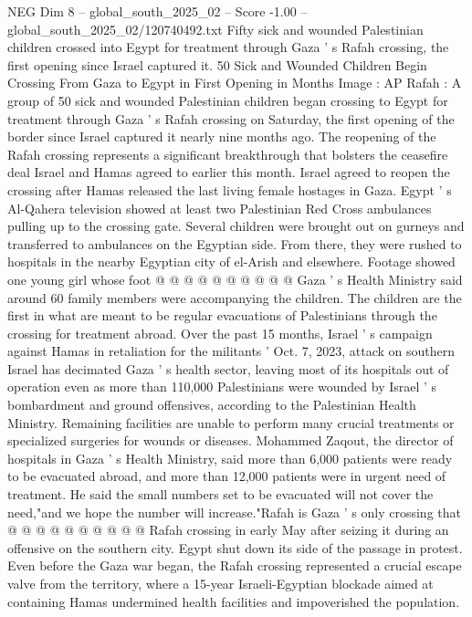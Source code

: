 \begin{textsample}{NEG Dim 8 – global\_south\_2025\_02 – Score -1.00 – global\_south\_2025\_02/120740492.txt}  \label{ex:f8_neg_370}
Fifty sick and wounded Palestinian children crossed into Egypt for treatment through Gaza ' s Rafah crossing, the first opening since Israel captured it. 50 Sick and Wounded Children Begin Crossing From Gaza to Egypt in First Opening in Months Image : AP Rafah : A group of 50 sick and wounded Palestinian children began crossing to Egypt for treatment through Gaza ' s Rafah crossing on Saturday, the first opening of the border since Israel captured it nearly nine months ago.
The reopening of the Rafah crossing represents a significant breakthrough that bolsters the ceasefire deal Israel and Hamas agreed to earlier this month.
Israel agreed to reopen the crossing after Hamas released the last living female hostages in Gaza.
Egypt ' s Al-Qahera television showed at least two Palestinian Red Cross ambulances pulling up to the crossing gate.
Several children were brought out on gurneys and transferred to ambulances on the Egyptian side.
From there, they were rushed to hospitals in the nearby Egyptian city of el-Arish and elsewhere.
Footage showed one young girl whose foot @ @ @ @ @ @ @ @ @ @ Gaza ' s Health Ministry said around 60 family members were accompanying the children.
The children are the first in what are meant to be regular evacuations of Palestinians through the crossing for treatment abroad.
Over the past 15 months, Israel ' s campaign against Hamas in retaliation for the militants ' Oct. 7, 2023, attack on southern Israel has decimated Gaza ' s health sector, leaving most of its hospitals out of operation even as more than 110,000 Palestinians were wounded by Israel ' s bombardment and ground offensives, according to the Palestinian Health Ministry.
Remaining facilities are unable to perform many crucial treatments or specialized surgeries for wounds or diseases.
Mohammed Zaqout, the director of hospitals in Gaza ' s Health Ministry, said more than 6,000 patients were ready to be evacuated abroad, and more than 12,000 patients were in urgent need of treatment.
He said the small numbers set to be evacuated will not cover the need,"and we hope the number will increase."Rafah is Gaza ' s only crossing that @ @ @ @ @ @ @ @ @ @ Rafah crossing in early May after seizing it during an offensive on the southern city.
Egypt shut down its side of the passage in protest.
Even before the Gaza war began, the Rafah crossing represented a crucial escape valve from the territory, where a 15-year Israeli-Egyptian blockade aimed at containing Hamas undermined health facilities and impoverished the population.

\end{textsample}
